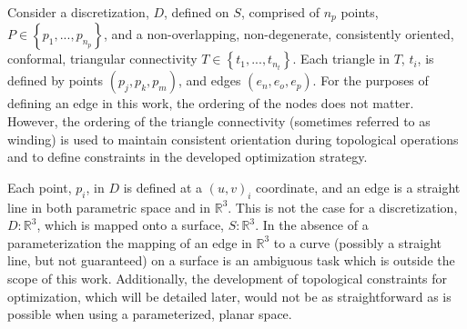 Consider a discretization, $D$, defined on $S$, comprised of $n_p$
points, $P \in \left\{p_1,...,p_{n_p} \right\}$, and a non-overlapping,
non-degenerate, consistently oriented, conformal, triangular
connectivity $T \in \left\{t_1,...,t_{n_t} \right\}$. Each triangle in
$T$, $t_i$, is defined by points $\left(p_j, p_k, p_m\right)$, and edges
$\left(e_n, e_o, e_p\right)$. For the purposes of defining an edge in this
work, the ordering of the nodes does not matter.  However, the ordering of the
triangle connectivity (sometimes referred to as winding) is used to maintain
consistent orientation during topological operations and to define constraints
in the developed optimization strategy.

Each point, $p_i$, in $D$ is defined at a $\left(u,v\right)_i$
coordinate, and an edge is a straight line in both parametric space and in
${\mathbb R}^3$. This is not the case for a discretization, $D:{\mathbb
R}^3$, which is mapped onto a surface, $S:{\mathbb R}^3$. In the absence
of a parameterization the mapping of an edge in ${\mathbb R}^3$ to a
curve (possibly a straight line, but not guaranteed) on a surface is an
ambiguous task which is outside the scope of this work. Additionally,
the development of topological constraints for optimization, which will
be detailed later, would not be as straightforward as is possible when
using a parameterized, planar space.
